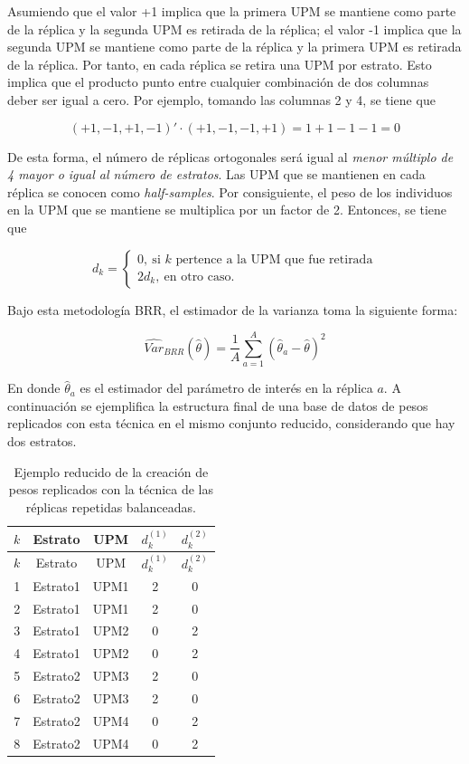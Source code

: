 \documentclass[
  12pt,
]{book}
\begin{document}
Asumiendo que el valor +1 implica que la primera UPM se mantiene como parte de la réplica y la segunda UPM es retirada de la réplica; el valor -1 implica que la segunda UPM se mantiene como parte de la réplica y la primera UPM es retirada de la réplica. Por tanto, en cada réplica se retira una UPM por estrato. Esto implica que el producto punto entre cualquier combinación de dos columnas deber ser igual a cero. Por ejemplo, tomando las columnas 2 y 4, se tiene que

\[
(+1, -1, +1, -1)' \cdot (+1, -1, -1, +1) 
=  1 + 1 - 1 -1 = 0 
\]

De esta forma, el número de réplicas ortogonales será igual al \emph{menor múltiplo de 4 mayor o igual al número de estratos}. Las UPM que se mantienen en cada réplica se conocen como \emph{half-samples}. Por consiguiente, el peso de los individuos en la UPM que se mantiene se multiplica por un factor de 2. Entonces, se tiene que

\[
d_{k} = 
\begin{cases}
0, \ \text{si $k$ pertence a la UPM que fue retirada}\\
2d_k, \ \text{en otro caso.}
\end{cases}
\]

Bajo esta metodología BRR, el estimador de la varianza toma la siguiente forma:

\[
\widehat{Var}_{BRR}(\hat{\theta}) = \frac{1}{A}\sum_{a=1}^A(\hat{\theta}_a - \hat\theta )^2
\]

En donde \(\hat{\theta}_a\) es el estimador del parámetro de interés en la réplica \(a\). A continuación se ejemplifica la estructura final de una base de datos de pesos replicados con esta técnica en el mismo conjunto reducido, considerando que hay dos estratos.

\begin{longtable}[]{@{}ccccc@{}}
\caption{Ejemplo reducido de la creación de pesos replicados con la técnica de las réplicas repetidas balanceadas.}\tabularnewline
\toprule()
\(k\) & Estrato & UPM & \(d_k^{(1)}\) & \(d_k^{(2)}\) \\
\midrule()
\endfirsthead
\toprule()
\(k\) & Estrato & UPM & \(d_k^{(1)}\) & \(d_k^{(2)}\) \\
\midrule()
\endhead
1 & Estrato1 & UPM1 & 2 & 0 \\
2 & Estrato1 & UPM1 & 2 & 0 \\
3 & Estrato1 & UPM2 & 0 & 2 \\
4 & Estrato1 & UPM2 & 0 & 2 \\
5 & Estrato2 & UPM3 & 2 & 0 \\
6 & Estrato2 & UPM3 & 2 & 0 \\
7 & Estrato2 & UPM4 & 0 & 2 \\
8 & Estrato2 & UPM4 & 0 & 2 \\
\bottomrule()
\end{longtable}
\end{document}
